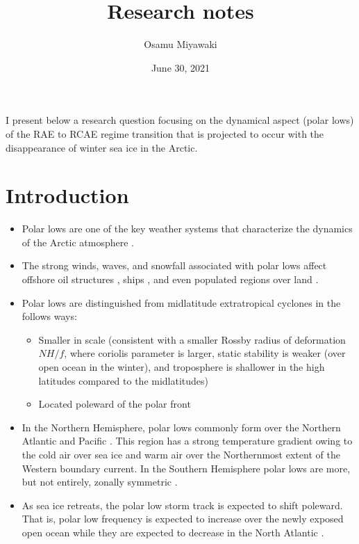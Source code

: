 \documentclass{article}
\title{Research notes}
\date{June 30, 2021}
\author{Osamu Miyawaki}
\begin{document}
\maketitle

I present below a research question focusing on the dynamical aspect (polar lows) of the RAE to RCAE regime transition that is projected to occur with the disappearance of winter sea ice in the Arctic.

\section{Introduction}
\begin{itemize}
	\item Polar lows are one of the key weather systems that characterize the dynamics of the Arctic atmosphere \citep{jonassen2020}.
	\item The strong winds, waves, and snowfall associated with polar lows affect offshore oil structures \citep{pakkan2013}, ships \citep{orimolade2017}, and even populated regions over land \citep[Japan in particular, e.g.,][]{yanase2016}.
    \item Polar lows are distinguished from midlatitude extratropical cyclones in the follows ways:
    \begin{itemize}
        \item Smaller in scale (consistent with a smaller Rossby radius of deformation $NH/f$, where coriolis parameter is larger, static stability is weaker (over open ocean in the winter), and troposphere is shallower in the high latitudes compared to the midlatitudes) \citep{rasmussen2003}
        \item Located poleward of the polar front \citep{heinemann1997}
    \end{itemize}
    \item In the Northern Hemisphere, polar lows commonly form over the Northern Atlantic and Pacific \citep[see Fig.~5a in][]{stoll2018}. This region has a strong temperature gradient owing to the cold air over sea ice and warm air over the Northernmost extent of the Western boundary current. In the Southern Hemisphere polar lows are more, but not entirely, zonally symmetric \citep[see Fig.~5b in][]{stoll2018}.
    \item As sea ice retreats, the polar low storm track is expected to shift poleward. That is, polar low frequency is expected to increase over the newly exposed open ocean \citep{zabolotskikh2015} while they are expected to decrease in the North Atlantic \citep{romero2017}.

\end{itemize}
\end{document}
